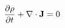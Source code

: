 \documentclass[preview]{standalone}
\begin{document}
\begin{align*}
\pdv{\rho}{t}+ \nabla \cdot \mathbf{J} = 0
\end{align*}
\end{document}
